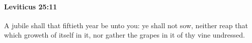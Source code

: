 
		\paragraph{Leviticus 25:11} %
			\label{LEVITICUS-25-11}

			A jubile shall that fiftieth year be unto you: ye shall not sow, neither reap that which groweth of itself in it, nor gather the grapes in it of thy vine undressed.


